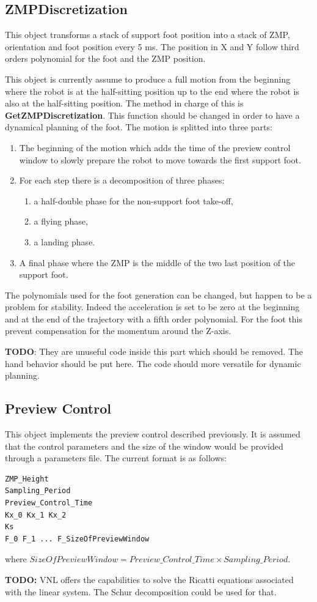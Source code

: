 \subsection{ZMPDiscretization}
This object transforms a stack of support foot position into a stack of ZMP, orientation and foot position every 5 ms.
The position in X and Y follow third orders polynomial for the foot and the ZMP position.
\par
This object is currently assume to produce a full motion from the beginning where the robot is at the half-sitting position
up to the end where the robot is also at the half-sitting position.
The method in charge of this is {\bf GetZMPDiscretization}. This function should be
changed in order to have a dynamical planning of the foot.
The motion is splitted into three parts:
\begin{enumerate}
\item The beginning of the motion which adds the time of the preview control window to slowly prepare
the robot to move towards the first support foot.
\item For each step there is a decomposition of three phases:
\begin{enumerate}
\item a half-double phase for the non-support foot take-off,
\item a flying phase,
\item a landing phase.
\end{enumerate}
\item A final phase where the ZMP is the middle of the two last position of the support foot.
\end{enumerate}
\par
The polynomials used for the foot generation can be changed, but happen to be a problem for stability.
Indeed the acceleration is set to be zero at the beginning
and at the end of the trajectory with a fifth order polynomial. For the foot this prevent compensation for the momentum around
the Z-axis.

{\bf TODO}: They are unuseful code inside this part which should be removed.
The hand behavior should be put here. The code should more versatile for dynamic planning.

\subsection{Preview Control}
This object implements the preview control described previously.
It is assumed that the control parameters and the size of the window would be provided through
a parameters file. The current format is as follows:
\begin{verbatim}
ZMP_Height
Sampling_Period
Preview_Control_Time
Kx_0 Kx_1 Kx_2
Ks
F_0 F_1 ... F_SizeOfPreviewWindow
\end{verbatim}
where $SizeOfPreviewWindow = Preview\_Control\_Time \times Sampling\_Period$.
\par
{\bf TODO:} VNL offers the capabilities to solve the Ricatti equations
associated with the linear system. The Schur decomposition could be used for that.

